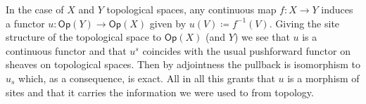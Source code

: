 \documentclass[../Main]{subfiles}
\begin{document}
\begin{ex}
	In the case of $X$ and $Y$ topological spaces, any continuous map
	$f\colon X \to Y$ induces a functor $u\colon \mathsf{Op}(Y) \to \mathsf{Op}(X)$
	given by $u(V) \coloneqq f^{-1}(V)$.
	Giving the site structure of the topological space to $\mathsf{Op}(X)$ (and $Y$)
	we see that $u$ is a continuous functor and that $u^s$ coincides with the
	usual pushforward functor on sheaves on topological spaces.
	Then by adjointness the pullback is isomorphism to $u_s$ which, as a consequence,
	is exact.
	All in all this grants that $u$ is a morphism of sites and that it carries the
	information we were used to from topology.
\end{ex}
\end{document}
